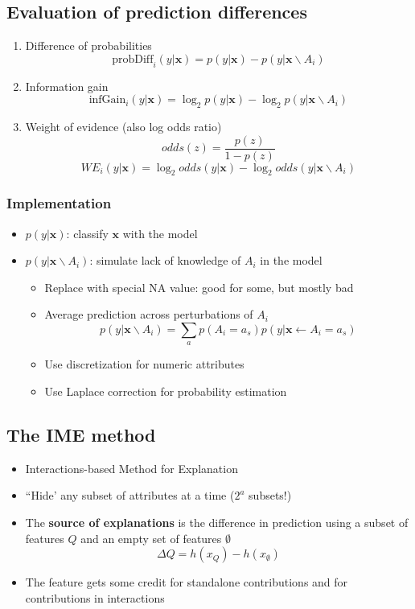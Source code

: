 \documentclass{article}
\begin{document}
    \subsection{Evaluation of prediction differences}
    \begin{enumerate}
        \item Difference of probabilities
        \[ \text{probDiff}_i(y \vert \mathbf{x}) = p(y \vert \mathbf{x}) - p(y \vert \mathbf{x} \backslash A_i) \]
        \item Information gain
        \[ \text{infGain}_i(y \vert \mathbf{x}) = \log_2 p(y \vert \mathbf{x}) - \log_2 p (y \vert \mathbf{x} \backslash A_i)\]
        \item Weight of evidence (also log odds ratio)
        \[ odds(z) = \frac{p(z)}{1 - p(z)} \]
        \[ WE_i(y \vert \mathbf{x}) = \log_2 odds(y \vert \mathbf{x}) - \log_2 odds(y \vert \mathbf{x} \backslash A_i) \] 
    \end{enumerate}

        \subsubsection{Implementation}
        \begin{itemize}
            \item $p(y \vert \mathbf{x})$: classify $\mathbf{x}$ with the model
            \item $p(y \vert \mathbf{x} \backslash A_i)$: simulate lack of knowledge of $A_i$ in the model
            \begin{itemize}
                \item Replace with special NA value: good for some, but mostly bad
                \item Average prediction across perturbations of $A_i$
                \[ p(y \vert \mathbf{x} \backslash A_i) = \sum_a p(A_i = a_s) p(y \vert \mathbf{x} \leftarrow A_i = a_s) \]
                \item Use discretization for numeric attributes
                \item Use Laplace correction for probability estimation
            \end{itemize}
        \end{itemize}

    \subsection{The IME method}
    \begin{itemize}
        \item Interactions-based Method for Explanation
        \item ``Hide' any subset of attributes at a time ($2^a$ subsets!)
        \item The \textbf{source of explanations} is the difference in prediction using a subset of features $Q$ and an empty set of features $\emptyset$
        \[ \Delta Q = h(x_Q) - h(x_\emptyset) \]
        \item The feature gets some credit for standalone contributions and for contributions in interactions
    \end{itemize}
\end{document}
